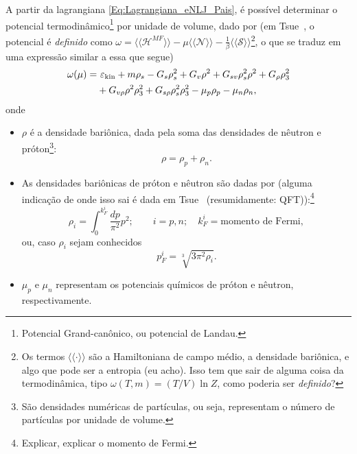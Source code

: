 A partir da lagrangiana \eqref{Eq:Lagrangiana_eNLJ_Pais}, é possível determinar  o potencial termodinâmico\footnote{Potencial Grand-canônico, ou potencial de Landau.} por unidade de volume, dado por (em Tsue~\cite{japoneses}, o potencial é \emph{definido} como $\omega = \langle\langle \mathcal{H}^{MF}\rangle\rangle - \mu\langle\langle\mathcal{N}\rangle\rangle - \frac{1}{\beta}\langle\langle\mathcal{S}\rangle\rangle$\footnote{Os termos $\langle\langle \cdot \rangle\rangle$ são a Hamiltoniana de campo médio, a densidade bariônica, e algo que pode ser a entropia (eu acho). Isso tem que sair de alguma coisa da termodinâmica, tipo $\omega (T, m) = (T/V) \ln Z$, como poderia ser \emph{definido}?}, o que se traduz em uma expressão similar a essa que segue)
\begin{equation}\label{Eq:potencial_termodinamico}
\begin{split}
	\omega(\mu) =&~ \varepsilon_{\rm{kin}} + m\rho_s - G_s\rho_s^2 + G_v\rho^2 + G_{sv}\rho_s^2\rho^2 + G_\rho\rho_3^2 \\
	&+ G_{v\rho}\rho^2\rho_3^2 + G_{s\rho}\rho_s^2\rho_3^2 - \mu_p\rho_p - \mu_n\rho_n,
\end{split}
\end{equation}
%
onde
\begin{itemize}
	\item $\rho$ é a densidade bariônica, dada pela soma das densidades de nêutron e próton\footnote[][-1cm]{São densidades numéricas de partículas, ou seja, representam o número de partículas por unidade de volume.}:
	\begin{equation}
		\rho = \rho_p + \rho_n.
	\end{equation}

	\item As densidades bariônicas de próton e nêutron são dadas por (alguma indicação de onde isso sai é dada em Tsue~\cite{japoneses} (resumidamente: QFT)):\footnote{Explicar, explicar o momento de Fermi.}
	\begin{equation}
		\rho_i = \int_0^{k_F^i}\frac{dp}{\pi^2}p^2; \qquad i = p,n; \quad k_F^i = \textrm{momento de Fermi},
	\end{equation}
	ou, caso $\rho_i$ sejam conhecidos
	\begin{equation}\label{Eq:Mom_Fermi_a_partir_de_rho}
		p_F^i = \sqrt[3]{3\pi^2\rho_i}.
	\end{equation}
	
	\item $\mu_p$ e $\mu_n$ representam os potenciais químicos de próton e nêutron, respectivamente.
\end{itemize}

